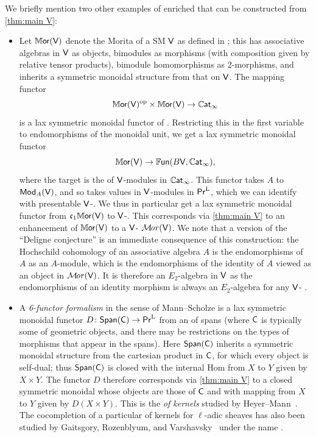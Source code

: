 \documentclass[a4paper,11pt]{article}
\newcommand{\tMor}{\tcatname{M}{or}}
\newcommand{\SM}{SM}
\begin{document}
We briefly mention two other examples of enriched
\icats{} that can be constructed from \cref{thm:main V}:
\begin{itemize}
\item Let $\tMor(\oV)$ denote the Morita \itcat{} of a \SM{} \icat{}
  $\textup{\textsf{V}}$ as defined in
  \cite{nmorita}; this has associative algebras in $\textup{\textsf{V}}$ as objects,
  bimodules as morphisms (with composition given by relative tensor
  products), bimodule homomorphisms as 2-morphisms, and inherits a
  symmetric monoidal structure from that on $\textup{\textsf{V}}$. The mapping
  functor
  \[ \tMor(\oV)^{\op} \times \tMor(\oV) \to \CATI\] is a lax symmetric
  monoidal functor of \itcats{}. Restricting this in the first
  variable to endomorphisms of the monoidal unit, we get a lax
  symmetric monoidal functor
  \[ \tMor(\oV) \to \FUN(B\oV, \CATI),\] where the target is the
  \itcat{} of $\textup{\textsf{V}}$-modules in $\mathbb{C}\mkern-0.5mu\textsf{\textup{at}}_{\infty}$. This functor takes $A$ to
  $\textup{\textsf{Mod}}_{A}(\textup{\textsf{V}})$, and so takes values in $\textup{\textsf{V}}$-modules in $\textup{\textsf{Pr}}^{\mathrm{L}}$, which we
  can identify with presentable $\textup{\textsf{V}}$-\icats{}. We thus in particular
  get a lax symmetric monoidal functor from $\core[1] \tMor(\oV)$ to
  $\textup{\textsf{V}}$-\icats{}. This corresponds via \cref{thm:main V} to an
  enhancement of $\tMor(\oV)$ to a $\textup{\textsf{V}}$-\itcat{}
  $\mathop{\mathcal{M}\!\mathit{or}}\nolimits(\textup{\textsf{V}})$. We note that a version of the ``Deligne
  conjecture'' \cite{KontsevichSoibelman,McClureSmith} is an immediate consequence of this construction: the
  Hochschild cohomology of an associative algebra $A$ is the
  endomorphisms of $A$ as an $A$-module, which is the endomorphisms of
  the identity of $A$ viewed as an object in
  $\mathop{\mathcal{M}\!\mathit{or}}\nolimits(\textup{\textsf{V}})$. It is therefore an $E_{2}$-algebra in $\textup{\textsf{V}}$
  as the endomorphisms of an identity morphism is always an
  $E_{2}$-algebra for any $\textup{\textsf{V}}$-\itcat{} \cite[Corollary 6.3.11]{enr}.
\item A \emph{6-functor formalism} in the sense of Mann--Scholze
  \cite{Scholze6} is a lax symmetric monoidal functor
  $D \colon \Span(\oC) \to \PrL$ from an \icat{} of spans (where $\textup{\textsf{C}}$
  is typically some \icat{} of geometric objects, and there may be
  restrictions on the types of morphisms that appear in the
  spans). Here $\textup{\textsf{Span}}(\textup{\textsf{C}})$ inherits a symmetric monoidal structure
  from the cartesian product in $\textup{\textsf{C}}$, for which every object is
  self-dual; thus $\textup{\textsf{Span}}(\textup{\textsf{C}})$ is closed with the internal Hom from
  $X$ to $Y$ given by $X \times Y$. The functor $D$ therefore
  corresponds via \cref{thm:main V} to a closed symmetric monoidal
  \itcat{} whose objects are those of $\textup{\textsf{C}}$ and with mapping \icats{}
  from $X$ to $Y$ given by $D(X \times Y)$. This is the \emph{\itcat{}
    of kernels} studied by Heyer--Mann~\cite{HeyerMann}. The
  cocompletion of a particular \itcat{} of kernels for $\ell$-adic
  sheaves has also been studied by Gaitsgory, Rozenblyum, and
  Varshavsky~\cite{GRV} under the name .
\end{itemize}
\end{document}
